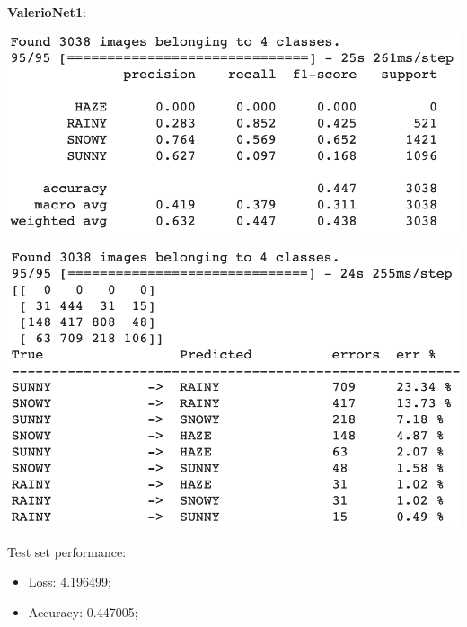 \documentclass[12pt]{article}
\begin{document}
\bigskip
{\bf ValerioNet1}: \newline
\begin{minipage}[c]{.5\textwidth}
 \centering
 \includegraphics[width=\textwidth]{pic8}
\end{minipage}
\hspace{1em}
\begin{minipage}[c]{.5\textwidth}
 \centering
 \includegraphics[width=\textwidth]{pic9}
\end{minipage}

Test set performance:
\begin{itemize}
 \item Loss: 4.196499;
 \item Accuracy: 0.447005;
\end{itemize}
\end{document}
